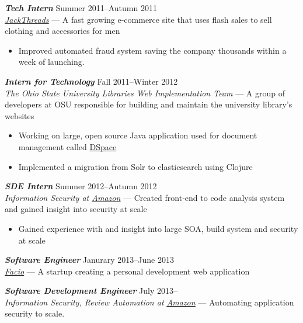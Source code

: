 \documentclass[line,letterpaper]{resume}
\begin{document}
\begin{resume}
    {\sl\textbf{Tech Intern}} \hfill Summer 2011--Autumn 2011\\
    \emph{\underline{\href{http://www.jackthreads.com/}{JackThreads}}}
    --- A fast growing e-commerce site that uses flash sales to sell clothing and
    accessories for men
    \begin{itemize}
        \item Improved automated fraud system saving the company
            thousands within a week of launching.
    \end{itemize}

    {\sl\textbf{Intern for Technology}} \hfill Fall 2011--Winter 2012\\
    \emph{The Ohio State University Libraries Web Implementation Team} --- A
    group of developers at OSU responsible for building and maintain the
    university library's websites
    \begin{itemize}
        \item Working on large, open source Java application used for document
            management called
            \underline{\href{https://github.com/osulibraries/DSpaceOSUKB/wiki}{DSpace}}
        \item Implemented a migration from Solr to elasticsearch using Clojure
    \end{itemize}

    {\sl\textbf{SDE Intern}} \hfill Summer 2012--Autumn 2012\\
    \emph{Information Security at
    \underline{\href{http://www.amazon.com/}{Amazon}}} --- Created front-end to
    code analysis system and gained insight into security at scale
    \begin{itemize}
        \item Gained experience with and insight into large SOA, build system
            and security at scale
    \end{itemize}
    \vspace{-6pt}

    {\sl\textbf{Software Engineer}} \hfill Janurary 2013--June 2013\\
    \emph{\underline{\href{http://www.facio.com/}{Facio}}} ---
    A startup creating a personal development web application
    \vspace{-6pt}

    {\sl\textbf{Software Development Engineer}} \hfill July 2013--\\
    \emph{Information Security, Review Automation at
    \underline{\href{http://www.amazon.com/}{Amazon}}} ---
    Automating application security to scale.
    \vspace{-6pt}



\end{resume}
\end{document}
